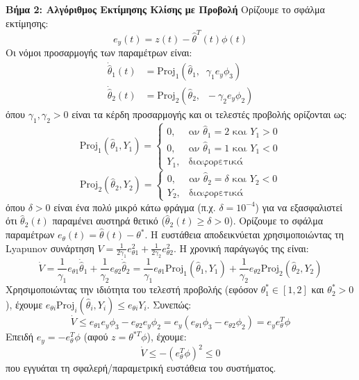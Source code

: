 \documentclass[a4paper,11pt]{article}
\begin{document}
\begin{answer}
\textbf{Βήμα 2: Αλγόριθμος Εκτίμησης Κλίσης με Προβολή}
Ορίζουμε το σφάλμα εκτίμησης:
\[ e_y(t) = z(t) - \hat{\theta}^T(t) \phi(t) \]
Οι νόμοι προσαρμογής των παραμέτρων είναι:
\begin{align*}
    \dot{\hat{\theta}}_1(t) &= \text{Proj}_1\left(\hat{\theta}_1, \;\; \gamma_1 e_y \phi_3\right) \\
    \dot{\hat{\theta}}_2(t) &= \text{Proj}_2\left(\hat{\theta}_2, \;\; -\gamma_2 e_y \phi_2\right)
\end{align*}
όπου $\gamma_1, \gamma_2 > 0$ είναι τα κέρδη προσαρμογής και οι τελεστές προβολής ορίζονται ως:
\[ \text{Proj}_1\left(\hat{\theta}_1, Y_1\right) = \begin{cases}
0, & \text{αν } \hat{\theta}_1 = 2 \text{ και } Y_1 > 0 \\
0, & \text{αν } \hat{\theta}_1 = 1 \text{ και } Y_1 < 0 \\
Y_1, & \text{διαφορετικά}
\end{cases} \]
\[ \text{Proj}_2\left(\hat{\theta}_2, Y_2\right) = \begin{cases}
0, & \text{αν } \hat{\theta}_2 = \delta \text{ και } Y_2 < 0 \\
Y_2, & \text{διαφορετικά}
\end{cases} \]
όπου $\delta > 0$ είναι ένα πολύ μικρό κάτω φράγμα (π.χ. $\delta = 10^{-4}$) για να εξασφαλιστεί ότι $\hat{\theta}_2(t)$ παραμένει αυστηρά θετικό ($\hat{\theta}_2(t) \ge \delta > 0$).
Ορίζουμε το σφάλμα παραμέτρων $e_\theta(t) = \hat{\theta}(t) - \theta^*$. Η ευστάθεια αποδεικνύεται χρησιμοποιώντας τη Lyapunov συνάρτηση $V = \frac{1}{2\gamma_1} e_{\theta 1}^2 + \frac{1}{2\gamma_2} e_{\theta 2}^2$.
Η χρονική παράγωγός της είναι:
\[ \dot{V} = \frac{1}{\gamma_1} e_{\theta 1} \dot{\hat{\theta}}_1 + \frac{1}{\gamma_2} e_{\theta 2} \dot{\hat{\theta}}_2 = \frac{1}{\gamma_1} e_{\theta 1} \text{Proj}_1\left(\hat{\theta}_1, Y_1\right) + \frac{1}{\gamma_2} e_{\theta 2} \text{Proj}_2\left(\hat{\theta}_2, Y_2\right) \]
Χρησιμοποιώντας την ιδιότητα του τελεστή προβολής (εφόσον $\theta_1^* \in [1,2]$ και $\theta_2^* > 0$), έχουμε $e_{\theta i} \text{Proj}_i(\hat{\theta}_i, Y_i) \le e_{\theta i} Y_i$. Συνεπώς:
\[ \dot{V} \le e_{\theta 1} e_y \phi_3 - e_{\theta 2} e_y \phi_2 = e_y \left( e_{\theta 1} \phi_3 - e_{\theta 2} \phi_2 \right) = e_y e_\theta^T \phi \]
Επειδή $e_y = -e_\theta^T \phi$ (αφού $z = \theta^{*T}\phi$), έχουμε:
\[ \dot{V} \le -(e_\theta^T \phi)^2 \le 0 \]
που εγγυάται τη σφαλερή/παραμετρική ευστάθεια του συστήματος.
\end{answer}
\end{document}
